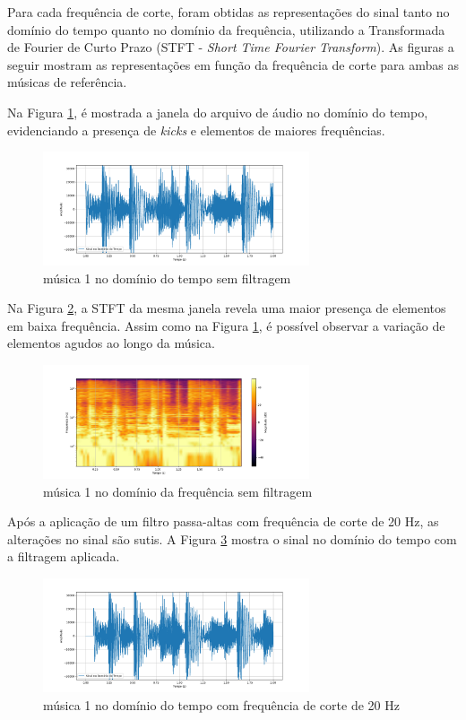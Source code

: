Para cada frequência de corte, foram obtidas as representações do sinal tanto no domínio do tempo quanto no domínio da frequência, utilizando a Transformada de Fourier de Curto Prazo (STFT - \textit{Short Time Fourier Transform}). As figuras a seguir mostram as representações em função da frequência de corte para ambas as músicas de referência.

Na Figura \ref{fig40}, é mostrada a janela do arquivo de áudio no domínio do tempo, evidenciando a presença de \textit{kicks} e elementos de maiores frequências.

\begin{figure}[h]
    \centering
    \includegraphics[width=0.7\textwidth]{figuras/fig40.png}
    \caption{música 1 no domínio do tempo sem filtragem}
    \label{fig40}
\end{figure}

Na Figura \ref{fig41}, a STFT da mesma janela revela uma maior presença de elementos em baixa frequência. Assim como na Figura \ref{fig40}, é possível observar a variação de elementos agudos ao longo da música.

\begin{figure}[h]
    \centering
    \includegraphics[width=0.7\textwidth]{figuras/fig41.png}
    \caption{música 1 no domínio da frequência sem filtragem}
    \label{fig41}
\end{figure}

Após a aplicação de um filtro passa-altas com frequência de corte de 20 Hz, as alterações no sinal são sutis. A Figura \ref{fig24} mostra o sinal no domínio do tempo com a filtragem aplicada.

\begin{figure}[h]
    \centering
    \includegraphics[width=0.7\textwidth]{figuras/fig24.png}
    \caption{música 1 no domínio do tempo com frequência de corte de 20 Hz}
    \label{fig24}
\end{figure}

